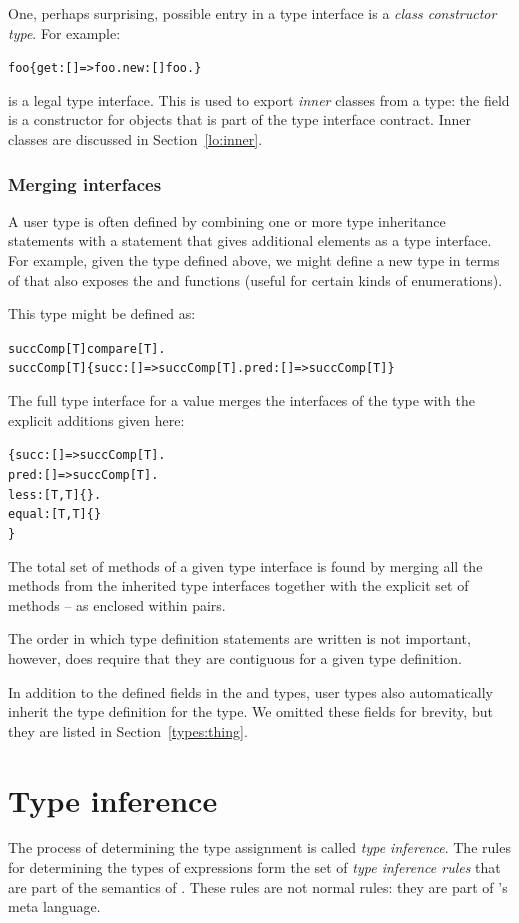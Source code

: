 One, perhaps surprising, possible entry in a type interface is a \emph{class constructor type}. For example:
\begin{alltt}
foo \impl \{ get:[]=>foo. new:[]\sconarrow{}foo. \}
\end{alltt}
is a legal type interface. This is used to export \emph{inner} classes from a type: the  field is a constructor for objects that is part of the  type interface contract. Inner classes are discussed in Section~\vref{lo:inner}.

\subsubsection{Merging interfaces}
A user type is often defined by combining one or more type inheritance statements with a statement that gives additional elements as a type interface. For example, given the type  defined above, we might define a new type in terms of  that also exposes the  and  functions (useful for certain kinds of enumerations).

This  type might be defined as:
\begin{alltt}
succComp[T]\impl{}compare[T].
succComp[T]\impl{}\{ succ:[]=>succComp[T]. pred:[]=>succComp[T] \}
\end{alltt}
The full type interface for a  value merges the interfaces of the  type with the explicit additions given here:
\begin{alltt}
\{ succ:[]=>succComp[T].
  pred:[]=>succComp[T].
  less:[T,T]\{\}. 
  equal:[T,T]\{\} 
\}
\end{alltt}
The total set of methods of a given type interface is found by merging all the methods from the inherited type interfaces together with the explicit set of methods -- as enclosed within \q{\{\}} pairs.

The order in which type definition statements are written is not important, however, \go does require that they are contiguous for a given type definition.
\begin{aside}
In addition to the defined fields in the  and  types, user types also automatically inherit the type definition for the  type. We omitted these fields for brevity, but they are listed in Section~\vref{types:thing}.
\end{aside}


\section{Type inference}
\label{type:inference}
The process of determining the type assignment is called \emph{type inference}. The rules for determining the types of expressions form the set of \emph{type inference rules} that are part of the semantics of \go. These rules are not normal \go rules: they are part of \go's meta language.

